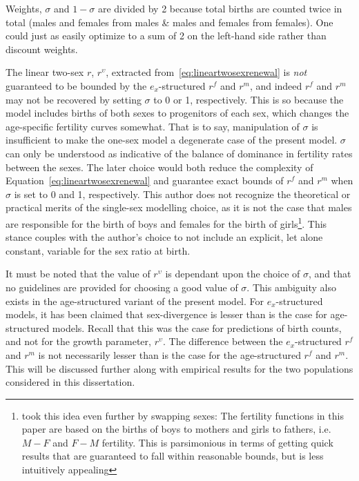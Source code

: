 Weights, $\sigma$ and $1-\sigma$ are divided by 2 because
total births are counted twice in total (males and females from males \&
males and females from females). One could just as easily optimize to a sum of
2 on the left-hand side rather than discount weights.

The linear two-sex $r$, $r^\upsilon$, extracted from~\eqref{eq:lineartwosexrenewal} 
is \textit{not} guaranteed to be bounded by the $e_x$-structured $r^f$ and $r^m$,
and indeed $r^f$ and $r^m$ may not be recovered by setting $\sigma$ to 0 or 1,
respectively. This is so because the model includes births of both sexes to
progenitors of each sex, which changes the age-specific fertility curves
somewhat. That is to say, manipulation of $\sigma$ is insufficient to make the
one-sex model a degenerate case of the present model. $\sigma$ can only be
understood as indicative of the balance of dominance in fertility rates between
the sexes. The later choice would both reduce the complexity of
Equation~\ref{eq:lineartwosexrenewal} and guarantee exact bounds of $r^f$ and $r^m$ 
when $\sigma$ is set to 0 and 1, respectively. This author does not recognize 
the theoretical or practical merits of the single-sex modelling choice, as it 
is not the case that males are responsible for the birth of boys and females 
for the birth of girls\footnote{\citet{pollard1948measurement} took this idea
even further by swapping sexes: The fertility functions in this paper are based on the births of boys to mothers and girls to fathers, i.e. $M-F$ and $F-M$ fertility. This is parsimonious 
in terms of getting quick results that are guaranteed to fall within reasonable bounds, but is less
intuitively appealing}. This stance couples with the author's choice to not
include an explicit, let alone constant, variable for the sex ratio at birth.

It must be
noted that the value of $r^\upsilon$ is dependant upon the choice of $\sigma$, 
and that no guidelines are provided for choosing a good value of $\sigma$. 
This ambiguity also exists in the age-structured variant of the present model. 
For $e_x$-structured models, it has been claimed that sex-divergence is lesser than is the case for
age-structured models. Recall that this was the case for predictions of birth
counts, and not for the growth parameter, $r^\upsilon$. The
difference between the $e_x$-structured $r^f$ and $r^m$ is not necessarily lesser than is the case for
the age-structured $r^f$ and $r^m$. This will be discussed further along with
empirical results for the two populations considered in this dissertation.
